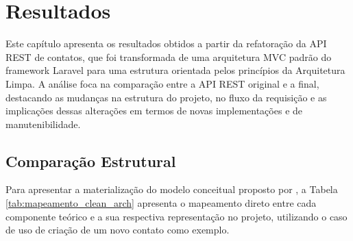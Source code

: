 \chapter{Resultados}
    \par Este capítulo apresenta os resultados obtidos a partir da refatoração da API REST de contatos, que foi transformada de uma arquitetura MVC padrão do framework Laravel para uma estrutura orientada pelos princípios da Arquitetura Limpa. A análise foca na comparação entre a API REST original e a final, destacando as mudanças na estrutura do projeto, no fluxo da requisição e as implicações dessas alterações em termos de novas implementações e de manutenibilidade.
    
    \section{Comparação Estrutural}

        \par Para apresentar a materialização do modelo conceitual proposto por \cite{livro:martin:cleanarch}, a Tabela \ref{tab:mapeamento_clean_arch} apresenta o mapeamento direto entre cada componente teórico e a sua respectiva representação no projeto, utilizando o caso de uso de criação de um novo contato como exemplo.
        
